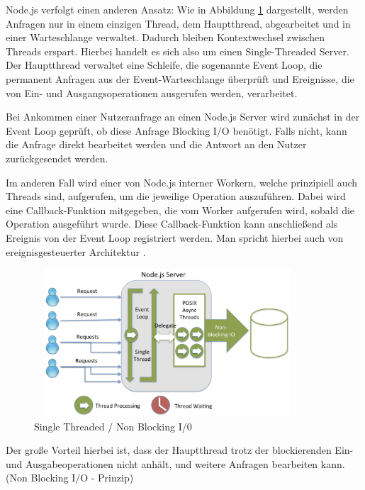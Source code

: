 \newpage

\noindent
Node.js verfolgt einen anderen Ansatz: Wie in Abbildung \ref{SingleThreaded} dargestellt, werden Anfragen nur in einem einzigen Thread, dem Hauptthread, abgearbeitet und in einer Warteschlange verwaltet. Dadurch bleiben Kontextwechsel zwischen Threads erspart. Hierbei handelt es sich also um einen Single-Threaded Server. Der Hauptthread verwaltet eine Schleife, die sogenannte Event Loop, die permanent Anfragen aus der Event-Warteschlange überprüft und Ereignisse, die von Ein- und Ausgangsoperationen ausgerufen werden, verarbeitet.
\newline

\noindent
Bei Ankommen einer Nutzeranfrage an einen Node.js Server wird zunächst in der Event Loop geprüft, ob diese Anfrage Blocking I/O benötigt. Falls nicht, kann die Anfrage direkt bearbeitet werden und die Antwort an den Nutzer zurückgesendet werden. 
\newline

\noindent
Im anderen Fall wird einer von Node.js interner Workern, welche prinzipiell auch Threads sind, aufgerufen, um die jeweilige Operation auszuführen. Dabei wird eine Callback-Funktion mitgegeben, die vom Worker aufgerufen wird, sobald die Operation ausgeführt wurde. Diese Callback-Funktion kann anschließend als Ereignis von der Event Loop registriert werden. Man spricht hierbei auch von ereignisgesteuerter Architektur \cite{Node1.4}. 
\newline
 
\begin{figure}[tbt]
\centering
\includegraphics[width=10cm, height = 5.5cm]{images/nodejs_nodethreading.png}
\caption[Single Threaded / Non Blocking I/0]{Single Threaded / Non Blocking I/0 \cite{Node1.1}}
\label{SingleThreaded}
\end{figure}
 

\noindent
Der große Vorteil hierbei ist, dass der Hauptthread trotz der blockierenden Ein- und Aus\-gabeoperationen nicht anhält, und weitere Anfragen bearbeiten kann. (Non Blocking I/O - Prinzip) 
\newline

